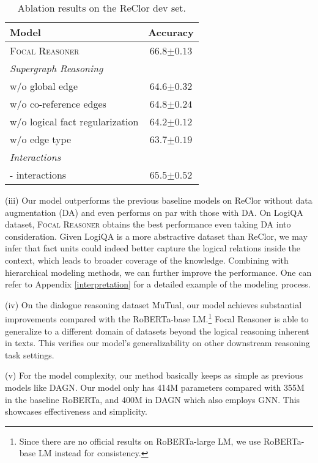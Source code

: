 \documentclass[11pt]{article}
\begin{document}
\begin{table}
\centering
\setlength{\belowcaptionskip}{5pt}
\vspace*{-3mm}
\small
\setlength{\tabcolsep}{16.0pt}
\begin{tabular}{lc}
    \toprule
    Model    & Accuracy \\
    \midrule
    \textsc{Focal Reasoner} & 66.8\scriptsize$\pm 0.13$ \\
    \midrule
    \textit{Supergraph Reasoning}  \\
    \quad w/o global edge  & 64.6\scriptsize$\pm 0.32$\\
    \quad w/o co-reference edges & 64.8\scriptsize$\pm 0.24$\\
    \quad w/o logical fact regularization & 64.2\scriptsize$\pm 0.12$ \\
\quad w/o edge type & 63.7\scriptsize$\pm 0.19$ \\
\midrule
    \textit{Interactions} \\
    \quad - interactions&  65.5\scriptsize$\pm 0.52$  \\
    \bottomrule
  \end{tabular}
  \caption{Ablation results on the ReClor dev set.}\label{ablation}
\vspace*{-5mm}
\end{table}

(iii) Our model outperforms the previous baseline models on ReClor without data augmentation (DA) and even performs on par with those with DA. On LogiQA dataset, \textsc{Focal Reasoner} obtains the best performance even taking DA into consideration. Given LogiQA is a more abstractive dataset than ReClor, we may infer that fact units could indeed better capture the logical relations inside the context, which leads to broader coverage of the knowledge. Combining with hierarchical modeling methods, we can further improve the performance. One can refer to Appendix \ref{interpretation} for a detailed example of the modeling process.


(iv) On the dialogue reasoning dataset MuTual, our model achieves substantial improvements compared with the RoBERTa-base LM.\footnote{Since there are no official results on RoBERTa-large LM, we use RoBERTa-base LM instead for consistency.} Focal Reasoner is able to generalize to a different domain of datasets beyond the logical reasoning inherent in texts. This verifies our model's generalizability on other downstream reasoning task settings.

(v) For the model complexity, our method basically keeps as simple as previous models like DAGN. Our model only has 414M parameters compared with 355M in the baseline RoBERTa, and 400M in DAGN which also employs GNN. This showcases effectiveness and simplicity.
\end{document}
